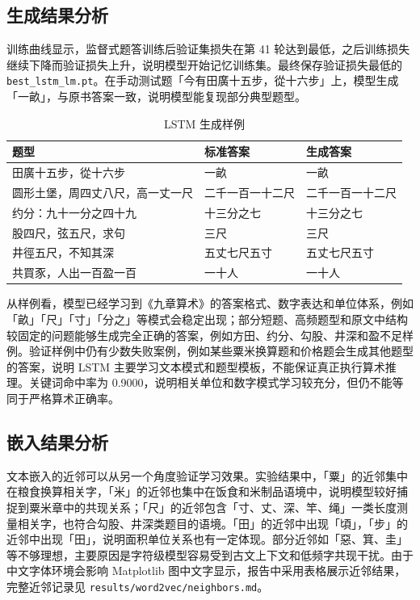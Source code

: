 \documentclass[a4paper,10pt,twocolumn]{article}
\begin{document}
\subsection{生成结果分析}
训练曲线显示，监督式题答训练后验证集损失在第 41 轮达到最低，之后训练损失继续下降而验证损失上升，说明模型开始记忆训练集。最终保存验证损失最低的 \texttt{best\_lstm\_lm.pt}。在手动测试题「今有田廣十五步，從十六步」上，模型生成「一畝」，与原书答案一致，说明模型能复现部分典型题型。

\begin{table}[H]
\centering
\small
\caption{LSTM 生成样例}
\begin{tabular}{p{}|p{}|p{}}
\toprule
题型 & 标准答案 & 生成答案 \\
\midrule
田廣十五步，從十六步 & 一畝 & 一畝 \\
圆形土堡，周四丈八尺，高一丈一尺 & 二千一百一十二尺 & 二千一百一十二尺 \\
约分：九十一分之四十九 & 十三分之七 & 十三分之七 \\
股四尺，弦五尺，求句 & 三尺 & 三尺 \\
井徑五尺，不知其深 & 五丈七尺五寸 & 五丈七尺五寸 \\
共買豕，人出一百盈一百 & 一十人 & 一十人 \\
\bottomrule
\end{tabular}
\end{table}

从样例看，模型已经学习到《九章算术》的答案格式、数字表达和单位体系，例如「畝」「尺」「寸」「分之」等模式会稳定出现；部分短题、高频题型和原文中结构较固定的问题能够生成完全正确的答案，例如方田、约分、勾股、井深和盈不足样例。验证样例中仍有少数失败案例，例如某些粟米换算题和价格题会生成其他题型的答案，说明 LSTM 主要学习文本模式和题型模板，不能保证真正执行算术推理。关键词命中率为 0.9000，说明相关单位和数字模式学习较充分，但仍不能等同于严格算术正确率。

\subsection{嵌入结果分析}
文本嵌入的近邻可以从另一个角度验证学习效果。实验结果中，「粟」的近邻集中在粮食换算相关字，「米」的近邻也集中在饭食和米制品语境中，说明模型较好捕捉到粟米章中的共现关系；「尺」的近邻包含「寸、丈、深、竿、绳」一类长度测量相关字，也符合勾股、井深类题目的语境。「田」的近邻中出现「頃」，「步」的近邻中出现「田」，说明面积单位关系也有一定体现。部分近邻如「惡、箕、圭」等不够理想，主要原因是字符级模型容易受到古文上下文和低频字共现干扰。由于中文字体环境会影响 Matplotlib 图中文字显示，报告中采用表格展示近邻结果，完整近邻记录见 \texttt{results/word2vec/neighbors.md}。
\end{document}
